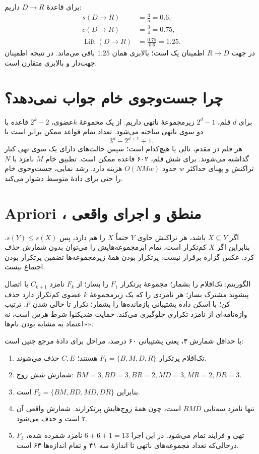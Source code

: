 برای قاعدهٔ $D\to R$ داریم:
\begin{align*}
s(D\to R)&=\frac35=0.6,\\
c(D\to R)&=\frac34=0.75,\\
\operatorname{Lift}(D\to R)&=\frac{0.75}{0.6}=1.25.
\end{align*}
در جهت $R\to D$ اطمینان یک است؛ بالابری همان $1.25$ باقی می‌ماند. در نتیجه اطمینان جهت‌دار و بالابری متقارن است.

\section{چرا جست‌وجوی خام جواب نمی‌دهد؟}

برای $d$ قلم، $2^d-1$ زیرمجموعهٔ ناتهی داریم. از یک مجموعهٔ $k$عضوی، $2^k-2$ قاعده با دو سوی ناتهی ساخته می‌شود. تعداد تمام قواعد ممکن برابر است با
\[3^d-2^{d+1}+1.\]
هر قلم در مقدم، تالی یا هیچ‌کدام است؛ سپس حالت‌های دارای یک سوی تهی کنار گذاشته می‌شوند. برای شش قلم، ۶۰۲ قاعده ممکن است. تطبیق خام $M$ نامزد با $N$ تراکنش و پهنای حداکثر $w$ حدود $O(NMw)$ هزینه دارد. رشد نمایی، جست‌وجوی خام را حتی برای دادهٔ متوسط دشوار می‌کند.

\section{Apriori ، منطق و اجرای واقعی}

اگر $X\subseteq Y$ باشد، هر تراکنش حاوی $Y$ حتماً $X$ را هم دارد، پس $s(Y)\le s(X)$. بنابراین اگر $X$ کم‌تکرار است، تمام ابرمجموعه‌هایش را می‌توان بدون شمارش حذف کرد. عکس گزاره برقرار نیست: پرتکرار بودن همهٔ زیرمجموعه‌ها تضمین پرتکرار بودن اجتماع نیست.

الگوریتم: تک‌اقلام را بشمار؛ مجموعهٔ پرتکرار $F_1$ را بساز؛ از $F_k$ نامزد $C_{k+1}$ با اتصال پیشوند مشترک بساز؛ هر نامزدی را که یک زیرمجموعهٔ $k$ عضوی کم‌تکرار دارد حذف کن؛ با اسکن داده پشتیبانی بازمانده‌ها را بشمار؛ تکرار تا خالی شدن $F$. ترتیب واژه‌نامه‌ای از نامزد تکراری جلوگیری می‌کند. حمایت ضدیکنوا شرط هرس است، نه «اعتماد به مشابه بودن نام‌ها».

با حداقل شمارش ۳، یعنی پشتیبانی ۶۰ درصد، مراحل برای دادهٔ مرجع چنین است:
\begin{enumerate}
\item تک‌اقلام پرتکرار $F_1=\{B,M,D,R\}$ هستند؛ $C,E$ حذف می‌شوند.
\item شمارش شش زوج: $BM=3,BD=3,BR=2,MD=3,MR=2,DR=3$.
\item بنابراین $F_2=\{BM,BD,MD,DR\}$ است.
\item تنها نامزد سه‌تایی $BMD$ است، چون همهٔ زوج‌هایش پرتکرارند. شمارش واقعی آن ۲ است و حذف می‌شود.
\item $F_3$ تهی و فرایند تمام می‌شود. در این اجرا $6+6+1=13$ نامزد شمرده شده، درحالی‌که تعداد مجموعه‌های ناتهی تا اندازهٔ سه ۴۱ و تمام اندازه‌ها ۶۳ است.
\end{enumerate}

